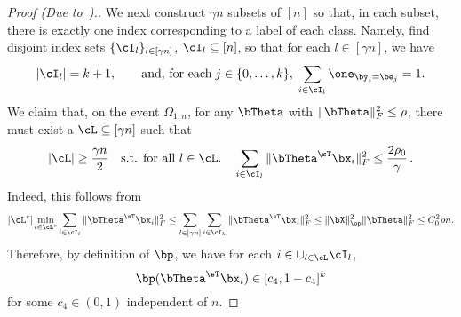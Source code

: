 \begin{proof}[Proof (Due to~\cite{tan2024multinomial}).]
We next construct $\gamma n$ subsets of $[n]$ so that, in each subset, there is exactly one index corresponding to a label of each class.  Namely, find disjoint index sets $\{\cI_l\}_{l\in [\gamma n]}$, $\cI_l\subseteq [n]$, so that for each $l\in [\gamma n]$, we have
\begin{equation}
|\cI_l| = k+1, \quad\quad\textrm{and,  for each}\; j\in\{0,\dots,k\},\;\sum_{i\in \cI_l} \one_{\by_i = \be_j} =1.
\end{equation}
%
We claim that,  on the event $\Omega_{1,n}$, for any $\bTheta$ with  $\|\bTheta\|_F^2\le \rho$,
there must exist a $\cL \subseteq [\gamma n]$ such that
\begin{equation}
\label{eq:cL_index_set_bound}
    |\cL| \ge \frac{\gamma n}{2} \quad\textrm{s.t. for all $l\in\cL$}.\quad \sum_{i \in\cI_l} \|\bTheta^\sT\bx_i\|_F^2 \le \frac{ 2\rho_0}{\gamma}\, .
\end{equation}
Indeed, this follows from
\begin{equation}
|\cL^c| \min_{l\in\cL^c} \sum_{i\in\cI_l} \|\bTheta^\sT\bx_i\|_F^2 \le 
\sum_{l\in[\gamma n]} \sum_{i\in\cI_k} \|\bTheta^\sT\bx_i\|_F^2  \le 
\|\bX\|_\op^2 \|\bTheta\|_F^2
\le C_0^2 \rho n.
\end{equation}
%
Therefore, by definition of $\bp$, we have for each $i\in \cup_{l\in\cL} \cI_l$,
\begin{equation}
\label{eq:entry_wise_bounds_p}
    \bp(\bTheta^\sT\bx_i)\in [c_4,1-c_4]^k
\end{equation}
for some $c_4 \in (0,1)$  independent of $n$.


\end{proof}
